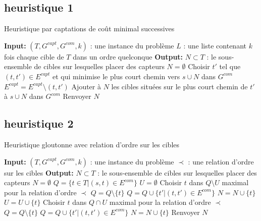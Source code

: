 \documentclass[12pt]{article}
\begin{document}
\subsection{heuristique 1}

\begin{algorithm}[H]
  \caption{Heuristique par captations de coût minimal successives}
  \label{Heuristique par captations de coût minimal successives}
  \begin{algorithmic}
      \STATE \textbf{Input:}
      \STATE $(T, G^{capt}, G^{com}, k)$ : une instance du problème
      \STATE $L$ : une liste contenant $k$ fois chaque cible de $T$ dans un ordre quelconque
      \STATE
      \STATE \textbf{Output:} $N \subset T$ : le sous-ensemble de cibles sur lesquelles placer des capteurs
      \STATE
      \STATE $N = \emptyset$
          \STATE Choisir $t'$ tel que $(t, t') \in E^{capt}$ et qui minimise le plus court chemin vers $s \cup N$ dans $G^{com}$
          \STATE $E^{capt} = E^{capt} \setminus (t, t')$
          \STATE Ajouter à $N$ les cibles situées sur le plus court chemin de $t'$ à $s \cup N$ dans $G^{com}$
      \ENDFOR
      \STATE Renvoyer $N$
  \end{algorithmic}
\end{algorithm}

\subsection{heuristique 2}

\begin{algorithm}[H]
  \caption{Heuristique gloutonne avec relation d'ordre sur les cibles}
  \label{Heuristique gloutonne avec relation d'ordre sur les cibles}
  \begin{algorithmic}
      \STATE \textbf{Input:}
      \STATE $(T, G^{capt}, G^{com},k)$ : une instance du problème
      \STATE $\prec$ : une relation d'ordre sur les cibles
      \STATE
      \STATE \textbf{Output:} $N \subset T$ : le sous-ensemble de cibles sur lesquelles placer des capteurs
      \STATE
      \STATE $N = \emptyset$
      \STATE $Q = \{t \in T | (s, t) \in E^{com}\}$
      \STATE $U = \emptyset$
              \STATE Choisir $t$ dans $Q \setminus U$ maximal pour la relation d'ordre $\prec$
                  \STATE $Q  = Q \setminus \{t\}$
                  \STATE $Q  = Q \cup \{t' | (t, t') \in E^{com}\}$
                  \STATE $N  = N \cup \{t\}$
              \ELSE
                  \STATE $U  = U \cup \{t\}$
              \ENDIF
          \ELSE 
              \STATE Choisir $t$ dans $Q \cap U$ maximal pour la relation d'ordre $\prec$
              \STATE $Q  = Q \setminus \{t\}$
              \STATE $Q  = Q \cup \{t' | (t, t') \in E^{com}\}$
              \STATE $N  = N \cup \{t\}$
          \ENDIF
      \ENDWHILE
      \STATE Renvoyer $N$
  \end{algorithmic}
\end{algorithm}
\end{document}

